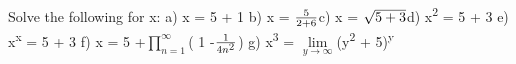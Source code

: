 \documentclass[12pt]{article}
\begin{document}
Solve the following for x:
\newline
a) x = 5 + 1
\newline
b) x = $\frac{5}{2 + 6}
\newline
$c) x = $\sqrt{5 + 3}
\newline
$d) x\textsuperscript{2 }= 5 + 3
\newline
e) x\textsuperscript{x }= 5 + 3
\newline
f) x = 5 +$\prod\limits^{\infty }_{n= 1}$( 1 -$\frac{1}{4n\textsuperscript{2}}$)
\newline
g) x\textsuperscript{3 }= $\lim\limits_{y\rightarrow \infty }$(y\textsuperscript{2 }+ 5)\textsuperscript{y}
\end{document}
